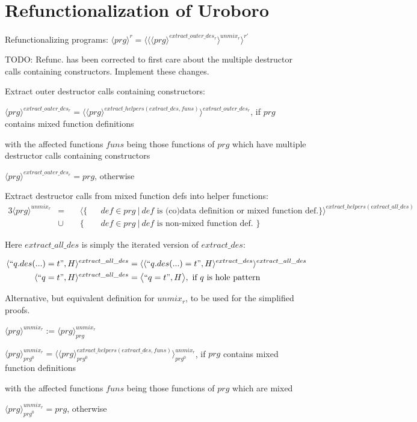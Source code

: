 \documentclass[11pt]{article} %
\begin{document}
\section{Refunctionalization of Uroboro}

Refunctionalizing programs: $\langle prg \rangle^r = \langle \langle \langle prg \rangle^{extract\_outer\_des_r} \rangle^{unmix_r} \rangle^{r'}$

TODO: Refunc. has been corrected to first care about the
multiple destructor calls containing constructors. Implement these changes.

Extract outer destructor calls containing constructors:

$\langle prg \rangle^{extract\_outer\_des_r} = \langle \langle prg \rangle^{extract\_helpers(extract\_des, funs)} \rangle^{extract\_outer\_des_r}$, if $prg$ contains mixed function definitions

with the affected functions $funs$ being those functions of $prg$ which have multiple destructor calls containing constructors

$\langle prg \rangle^{extract\_outer\_des_r} = prg$, otherwise


Extract destructor calls from mixed function defs into helper functions:
\begin{alignat*}{3}
\langle prg \rangle^{unmix_r} & = ~&& \langle \{ && def \in prg ~ | ~ def \textrm{ is (co)data definition or mixed function def.} \} \rangle^{extract\_helpers(extract\_all\_des)} \\
&\cup && \{ && def \in prg ~ | ~ def \textrm{ is non-mixed function def. } \}
\end{alignat*}

Here $extract\_all\_des$ is simply the iterated version of $extract\_des$:

\begin{alignat*}{2}
\langle `` q.des(...) = t ", H \rangle^{extract\_all\_des} & = \langle \langle `` q.des(...) = t ", H \rangle^{extract\_des} \rangle^{extract\_all\_des} \\
\langle `` q = t ", H \rangle^{extract\_all\_des} & = \big\langle `` q = t ", H \big\rangle, \textrm{ if $q$ is hole pattern}
\end{alignat*}

\begin{framed}
Alternative, but equivalent definition for $unmix_r$, to be used for the simplified proofs.

$\langle prg \rangle^{unmix_r} := \langle prg \rangle^{unmix_r}_{prg}$

$\langle prg \rangle^{unmix_r}_{prg^0} = \langle \langle prg \rangle^{extract\_helpers(extract\_des, funs)}_{prg^0} \rangle^{unmix_r}_{prg^0}$, if $prg$ contains mixed function definitions

with the affected functions $funs$ being those functions of $prg$ which are mixed

$\langle prg \rangle^{unmix_r}_{prg^0} = prg$, otherwise

\end{framed}
\end{document}
